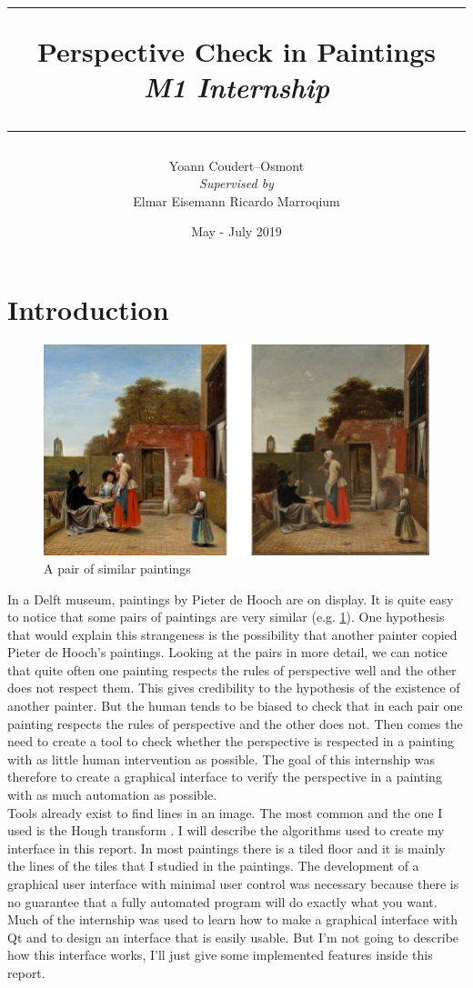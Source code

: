 \documentclass[10pt]{article}
\title{
	\rule{\linewidth}{0.4mm}
	\textbf{Perspective Check in Paintings} \\
	\textit{M1 Internship}
	\rule{\linewidth}{0.6mm}
}
\author{
	Yoann Coudert--Osmont \\[3mm]
	\textit{Supervised by} \\
	Elmar Eisemann \qquad Ricardo Marroqium \\[2mm]
}
\date{May - July 2019}
\begin{document}
	\maketitle
	
	\section*{Introduction}
	
	\begin{figure}
		\centering
		\includegraphics[scale=1.25]{paintings_pair.jpg}
		\caption{A pair of similar paintings}
		\label{im:pair}
	\end{figure}

	In a Delft museum, paintings by Pieter de Hooch are on display. It is quite easy to notice that some pairs of paintings are very similar (e.g. \figurename \ref{im:pair}). One hypothesis that would explain this strangeness is the possibility that another painter copied Pieter de Hooch's paintings. Looking at the pairs in more detail, we can notice that quite often one painting respects the rules of perspective well and the other does not respect them. This gives credibility to the hypothesis of the existence of another painter. But the human tends to be biased to check that in each pair one painting respects the rules of perspective and the other does not. Then comes the need to create a tool to check whether the perspective is respected in a painting with as little human intervention as possible. The goal of this internship was therefore to create a graphical interface to verify the perspective in a painting with as much automation as possible. \\
	Tools already exist to find lines in an image. The most common and the one I used is the Hough transform \cite{hough}. I will describe the algorithms used to create my interface in this report. In most paintings there is a tiled floor and it is mainly the lines of the tiles that I studied in the paintings. The development of a graphical user interface with minimal user control was necessary because there is no guarantee that a fully automated program will do exactly what you want. Much of the internship was used to learn how to make a graphical interface with Qt and to design an interface that is easily usable. But I'm not going to describe how this interface works, I'll just give some implemented features inside this report.
\end{document}
